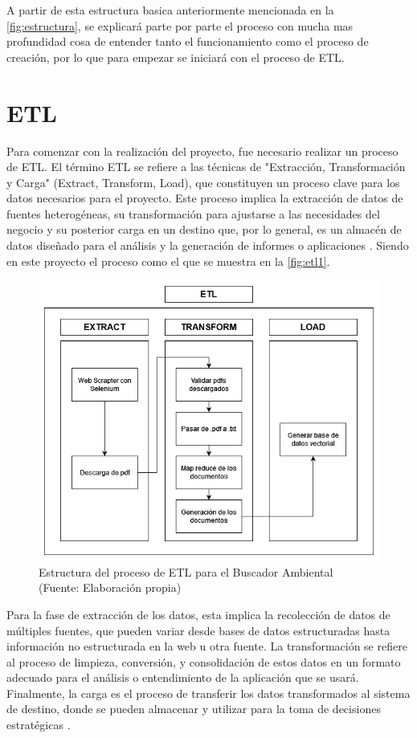 A partir de esta estructura basica anteriormente mencionada en la \autoref{fig:estructura}, se explicará parte 
por parte el proceso con mucha mas profundidad cosa de entender tanto el funcionamiento como el proceso de creación, 
por lo que para empezar se iniciará con el proceso de ETL.



\section{ETL}


Para comenzar con la realización del proyecto, fue necesario realizar un proceso de ETL. El término ETL se refiere a las técnicas de "Extracción, 
Transformación y Carga" (Extract, Transform, Load), que constituyen un proceso clave para los datos necesarios para el proyecto. 
Este proceso implica la extracción de datos de fuentes heterogéneas, su transformación para ajustarse a las necesidades del 
negocio y su posterior carga en un destino que, por lo general, es un almacén de datos diseñado para el análisis y la generación 
de informes o aplicaciones \cite{ETL1}. Siendo en este proyecto el proceso como el que se muestra en la \autoref{fig:etl1}.

\begin{figure}[ht!]
    \centering
    \includegraphics[width=.7\textwidth]{figures/huemulETL.png}
    \caption[Estructura del proceso de ETL para el Buscador Ambiental]{Estructura del proceso de ETL para el Buscador Ambiental\\
    {\scriptsize (Fuente: Elaboración propia)}}
    \label{fig:etl1}
\end{figure}
    

Para la fase de extracción de los datos, esta implica la recolección de datos de múltiples fuentes, que pueden variar desde bases de datos 
estructuradas hasta información no estructurada en la web u otra fuente. La transformación se refiere al proceso de limpieza, conversión, 
y consolidación de estos datos en un formato adecuado para el análisis o entendimiento de la aplicación que se usará. Finalmente, la carga es el proceso de transferir 
los datos transformados al sistema de destino, donde se pueden almacenar y utilizar para la toma de decisiones estratégicas 
\cite{ETL1}.

